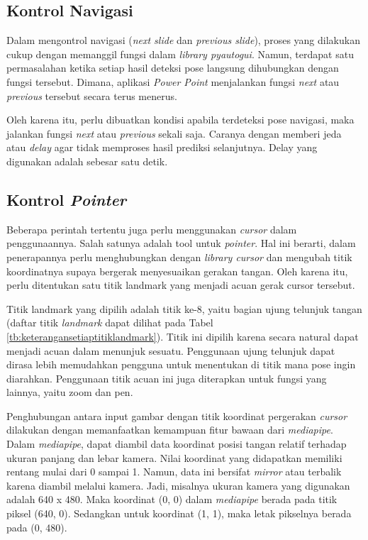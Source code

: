 \subsection{Kontrol Navigasi}
\label{Kontrol Navigasi}
Dalam mengontrol navigasi (\emph{next slide} dan \emph{previous slide}), proses yang dilakukan cukup dengan memanggil fungsi dalam \emph{library pyautogui}. Namun, terdapat satu permasalahan ketika setiap hasil deteksi pose langsung dihubungkan dengan fungsi tersebut. Dimana, aplikasi \emph{Power Point} menjalankan fungsi \emph{next} atau \emph{previous} tersebut secara terus menerus. 

Oleh karena itu, perlu dibuatkan kondisi apabila terdeteksi pose navigasi, maka jalankan fungsi \emph{next} atau \emph{previous} sekali saja. Caranya dengan memberi jeda atau \emph{delay} agar tidak memproses hasil prediksi selanjutnya. Delay yang digunakan adalah sebesar satu detik.

\subsection{Kontrol \emph{Pointer}}
\label{subsec:Kontrol Pointer}

Beberapa perintah tertentu juga perlu menggunakan \emph{cursor} dalam penggunaannya. Salah satunya adalah {tool} untuk \emph{pointer}. Hal ini berarti, dalam penerapannya perlu menghubungkan dengan \emph{library cursor} dan mengubah titik koordinatnya supaya bergerak menyesuaikan gerakan tangan. Oleh karena itu, perlu ditentukan satu titik landmark yang menjadi acuan gerak cursor tersebut. 

Titik landmark yang dipilih adalah titik ke-8, yaitu bagian ujung telunjuk tangan (daftar titik \emph{landmark} dapat dilihat pada Tabel \ref{tb:keterangansetiaptitiklandmark}). Titik ini dipilih karena secara natural dapat menjadi acuan dalam menunjuk sesuatu. Penggunaan ujung telunjuk dapat dirasa lebih memudahkan pengguna untuk menentukan di titik mana pose ingin diarahkan. Penggunaan titik acuan ini juga diterapkan untuk fungsi yang lainnya, yaitu zoom dan pen.

Penghubungan antara input gambar dengan titik koordinat pergerakan \emph{cursor} dilakukan dengan memanfaatkan kemampuan fitur bawaan dari \emph{mediapipe}. Dalam \emph{mediapipe}, dapat diambil data koordinat posisi tangan relatif terhadap ukuran panjang dan lebar kamera. Nilai koordinat yang didapatkan memiliki rentang mulai dari 0 sampai 1. Namun, data ini bersifat \emph{mirror} atau terbalik karena diambil melalui kamera. Jadi, misalnya ukuran kamera yang digunakan adalah 640 x 480. Maka koordinat (0, 0) dalam \emph{mediapipe} berada pada titik piksel (640, 0). Sedangkan untuk koordinat (1, 1), maka letak pikselnya berada pada (0, 480). 

